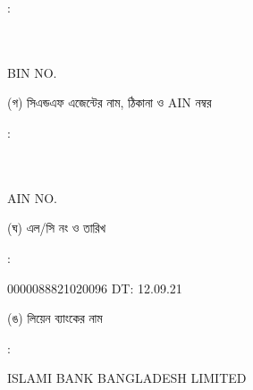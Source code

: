 \documentclass[12pt]{article}
\newcommand{\lcno}{0000088821020096}
\newcommand{\lcdt}{12.09.21}
\newcommand{\lienbank}{ISLAMI BANK BANGLADESH LIMITED}
\newcommand{\impn}{\jeal}
\newcommand{\impadd}{\jeala}
\newcommand{\impbin}{\jealbin}
\begin{document}
\begin{minipage}[t]{0.02\linewidth}
:
\end{minipage}
\begin{minipage}[t]{0.53\linewidth}
\textbf{{\impn}}
\\
{\impadd}
\\
BIN NO. {\impbin}
\\
\end{minipage}
\begin{minipage}[t]{0.05\linewidth}
\hspace*{1em}
\end{minipage}
\begin{minipage}[t]{0.40\linewidth}
(গ) সিএন্ডএফ এজেন্টের নাম, ঠিকানা
ও AIN নম্বর
\end{minipage}
\begin{minipage}[t]{0.02\linewidth}
:
\end{minipage}
\begin{minipage}[t]{0.53\linewidth}
\textbf{{\cnfn}}
\\
{\cnfadd}
\\
AIN NO. {\cnfain}
\\
\end{minipage}
\begin{minipage}[t]{0.05\linewidth}
\hspace*{1em}
\end{minipage}
\begin{minipage}[t]{0.40\linewidth}
(ঘ) এল/সি নং ও তারিখ
\end{minipage}
\begin{minipage}[t]{0.02\linewidth}
:
\end{minipage}
\begin{minipage}[t]{0.53\linewidth}
{\lcno} \hspace{2em} DT: {\lcdt}
\\
\end{minipage}
\begin{minipage}[t]{0.05\linewidth}
\hspace*{1em}
\end{minipage}
\begin{minipage}[t]{0.40\linewidth}
(ঙ) লিয়েন ব্যাংকের নাম
\end{minipage}
\begin{minipage}[t]{0.02\linewidth}
:
\end{minipage}
\begin{minipage}[t]{0.53\linewidth}
{\lienbank}
\\
\end{minipage}
\end{document}
